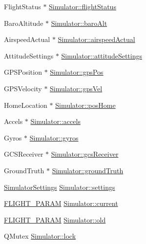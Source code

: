 \begin{DoxyCompactItemize}
Flight\-Status $\ast$ \hyperlink{group___h_i_t_l_plugin_ga2c3a29dc6471574d7182db7691e69a56}{Simulator\-::flight\-Status}
\item 
Baro\-Altitude $\ast$ \hyperlink{group___h_i_t_l_plugin_ga107f3bf3d4cc0c45cc8677742d4445eb}{Simulator\-::baro\-Alt}
\item 
Airspeed\-Actual $\ast$ \hyperlink{group___h_i_t_l_plugin_gadba0d3a66c5a15e0027b7d95fc9498b4}{Simulator\-::airspeed\-Actual}
\item 
Attitude\-Settings $\ast$ \hyperlink{group___h_i_t_l_plugin_ga4430b724d2151ce662d6b82a3b8ba74a}{Simulator\-::attitude\-Settings}
\item 
G\-P\-S\-Position $\ast$ \hyperlink{group___h_i_t_l_plugin_gae4d6ea654494f0de351686d9c35037ca}{Simulator\-::gps\-Pos}
\item 
G\-P\-S\-Velocity $\ast$ \hyperlink{group___h_i_t_l_plugin_ga649eab8811fb3f1e6596e48eac2d47c7}{Simulator\-::gps\-Vel}
\item 
Home\-Location $\ast$ \hyperlink{group___h_i_t_l_plugin_ga9fcd56565e3cb4d64bc0c71c0a6151c1}{Simulator\-::pos\-Home}
\item 
Accels $\ast$ \hyperlink{group___h_i_t_l_plugin_ga35cb24cdab1cfc0d1720b5b58fd0254f}{Simulator\-::accels}
\item 
Gyros $\ast$ \hyperlink{group___h_i_t_l_plugin_ga0f9daef3b0fe0731e035f2bff3d9df19}{Simulator\-::gyros}
\item 
G\-C\-S\-Receiver $\ast$ \hyperlink{group___h_i_t_l_plugin_gac63d17091bc4377e1b49696355a0ae19}{Simulator\-::gcs\-Receiver}
\item 
Ground\-Truth $\ast$ \hyperlink{group___h_i_t_l_plugin_ga6c62059f6d424f96ad1142bfe8885e3a}{Simulator\-::ground\-Truth}
\item 
\hyperlink{group___h_i_t_l_plugin_ga052199f1328d3002bce3e45345aa7f4e}{Simulator\-Settings} \hyperlink{group___h_i_t_l_plugin_ga61775246e91fbe43ce9d79c03bfde19f}{Simulator\-::settings}
\item 
\hyperlink{group___h_i_t_l_plugin_ga7bda7a22b899fe8dff0ba9a0cae99da6}{F\-L\-I\-G\-H\-T\-\_\-\-P\-A\-R\-A\-M} \hyperlink{group___h_i_t_l_plugin_gaa4ad7484ddab07936a31a63fab4be22e}{Simulator\-::current}
\item 
\hyperlink{group___h_i_t_l_plugin_ga7bda7a22b899fe8dff0ba9a0cae99da6}{F\-L\-I\-G\-H\-T\-\_\-\-P\-A\-R\-A\-M} \hyperlink{group___h_i_t_l_plugin_gadb185afa7e72d63655cb097e1c1d8200}{Simulator\-::old}
\item 
Q\-Mutex \hyperlink{group___h_i_t_l_plugin_ga807f372f1fd1876041ae159adca0514b}{Simulator\-::lock}
\end{DoxyCompactItemize}
